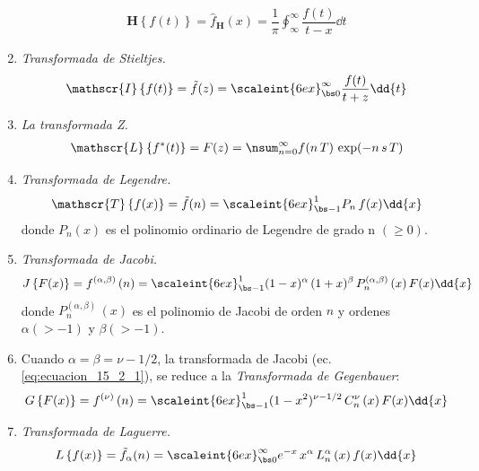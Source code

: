 \begin{enumerate}
\begin{align}
\mathbf{H} \left\{ f (t) \right\} = \hat{f}_{\mathbf{H}} (x) = \dfrac{1}{\pi} \oint_{\infty}^{\infty} \dfrac{f (t)}{t - x} \dd{t}
\label{eq:ecuacion_9_2_1}
\end{align}
\item \emph{Transformada de Stieltjes.}
\begin{align}
\mathscr{I} \left\{ f (t) \right\} = \tilde{f} (z) = \scaleint{6ex}_{\bs 0}^{\infty} \dfrac{f (t)}{t + z} \dd{t}
\label{eq:ecuacion_9_7_2}
\end{align}
\item \emph{La transformada Z.}
\begin{align}
\mathscr{L} \left\{ f^{*} (t) \right\} = F (z) = \nsum_{n=0}^{\infty} f ( n\, T) \, \exp(- n \, s \, T)
\label{eq:ecuacion_12_3_1}
\end{align}
\item \emph{Transformada de Legendre.}
\begin{align}
\mathscr{T} \left\{ f (x) \right\} = \tilde{f} (n) = \scaleint{6ex}_{\bs -1}^{1} P_{n} \, f (x) \dd{x}
\label{eq:ecuacion_14_2_1}
\end{align}
donde $P_{n} (x)$ es el polinomio ordinario de Legendre de grado n $(\geq 0)$.
\item \emph{Transformada de Jacobi.}
\begin{align}
J \left\{ F (x) \right\} = f^{(\alpha, \beta)} \, (n) = \scaleint{6ex}_{\bs -1}^{1} (1 - x)^{\alpha} \, (1 + x)^{\beta} \, P_{n}^{(\alpha, \beta)} \, (x) \, F (x) \dd{x}
\label{eq:ecuacion_15_2_1}
\end{align}
donde $P_{n}^{(\alpha, \beta)} \, (x)$ es el polinomio de Jacobi de orden $n$ y ordenes $\alpha (> -1)$ y $\beta (> -1)$.
\item Cuando $\alpha = \beta = \nu - 1/2$, la transformada de Jacobi (ec. \ref{eq:ecuacion_15_2_1}), se reduce a la \emph{Transformada de Gegenbauer}:
\begin{align}
G \left\{ F (x) \right\} = f^{(\nu)} \, (n) = \scaleint{6ex}_{\bs -1}^{1} (1 - x^{2})^{\nu - 1/2} \, C_{n}^{\nu} \, (x) \, F (x) \dd{x}
\label{eq:ecuacion_15_2_4}
\end{align}
\item \emph{Transformada de Laguerre.}
\begin{align}
L \left\{ f (x) \right\} = \tilde{f}_{\alpha} (n) = \scaleint{6ex}_{\bs 0}^{\infty} e^{-x} \, x^{\alpha} \, L_{n}^{\alpha} \, (x) \, f (x) \dd{x}
\label{eq:ecuacion_16_2_1}
\end{align}

\end{enumerate}
